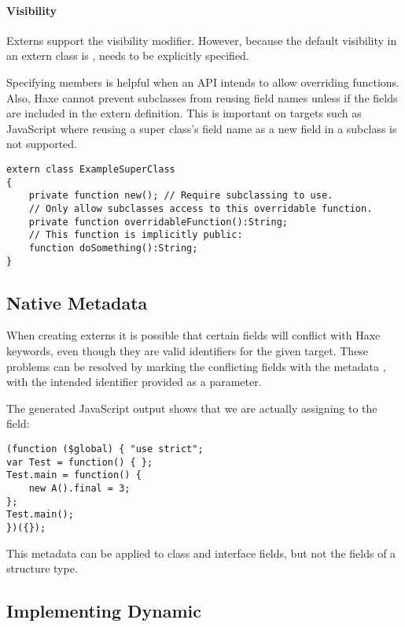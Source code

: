 \paragraph{Visibility}

Externs support the  visibility modifier. However, because the default visibility in an extern class is ,  needs to be explicitly specified.

Specifying  members is helpful when an API intends to allow overriding functions. Also, Haxe cannot prevent subclasses from reusing field names unless if the fields are included in the extern definition. This is important on targets such as JavaScript where reusing a super class’s field name as a new field in a subclass is not supported.

\begin{lstlisting}
extern class ExampleSuperClass
{
	private function new(); // Require subclassing to use.
	// Only allow subclasses access to this overridable function.
	private function overridableFunction():String;
	// This function is implicitly public:
	function doSomething():String;
}
\end{lstlisting}

\subsection{Native Metadata}
\label{lf-externs-native}

When creating externs it is possible that certain fields will conflict with Haxe keywords, even though they are valid identifiers for the given target. These problems can be resolved by marking the conflicting fields with the metadata , with the intended identifier provided as a parameter.


The generated JavaScript output shows that we are actually assigning to the  field:

\begin{lstlisting}
(function ($global) { "use strict";
var Test = function() { };
Test.main = function() {
	new A().final = 3;
};
Test.main();
})({});
\end{lstlisting}

This metadata can be applied to class and interface fields, but not the fields of a structure type.

\subsection{Implementing Dynamic}
\label{types-dynamic-implemented}


